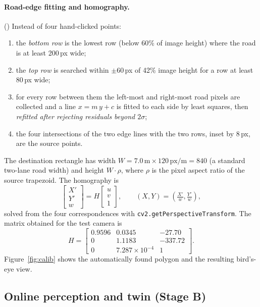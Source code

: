 \documentclass[11pt,a4paper]{article}
\DeclareRobustCommand{\file}[1]{\texttt{\detokenize{#1}}}
\begin{document}
\paragraph{Road-edge fitting and homography.} (\file{homo_IPM.py})
Instead of four hand-clicked points:
\begin{enumerate}[nosep]
  \item the \emph{bottom row} is the lowest row (below 60\% of image height) where the road is at least 200\,px wide;
  \item the \emph{top row} is searched within $\pm 60$\,px of 42\% image height for a row at least 80\,px wide;
  \item for every row between them the left-most and right-most road pixels are collected and a line
        $x = m\,y + c$ is fitted to each side by least squares, then \emph{refitted after rejecting residuals beyond $2\sigma$};
  \item the four intersections of the two edge lines with the two rows, inset by 8\,px, are the source points.
\end{enumerate}
The destination rectangle has width $W = 7.0\,\text{m} \times 120\,\text{px/m} = 840$ (a standard two-lane road width)
and height $W\cdot\rho$, where $\rho$ is the pixel aspect ratio of the source trapezoid. The homography is
\begin{equation}
  \begin{bmatrix} X' \\ Y' \\ w \end{bmatrix} = H \begin{bmatrix} u \\ v \\ 1 \end{bmatrix},\qquad
  (X,Y) = \left(\tfrac{X'}{w}, \tfrac{Y'}{w}\right),
\end{equation}
solved from the four correspondences with \texttt{cv2.getPerspectiveTransform}. The matrix obtained for the test camera is
\begin{equation}
H = \begin{bmatrix}
0.9596 & 0.0345 & -27.70\\
0 & 1.1183 & -337.72\\
0 & 7.287\times10^{-4} & 1
\end{bmatrix}.
\end{equation}
Figure~\ref{fig:calib} shows the automatically found polygon and the resulting bird's-eye view.

\subsection{Online perception and twin (Stage B)}
\end{document}
